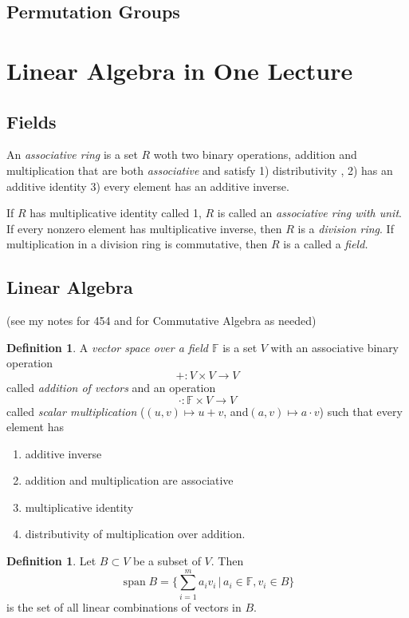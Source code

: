 \documentclass[12pt]{article}
\theoremstyle{definition}
\newtheorem{defn}[thm]{Definition}
\def\FF{\mathbb{F}}
\DeclareMathOperator{\spann}{span}
\begin{document}
\subsection{Permutation Groups} 

\section{Linear Algebra in One Lecture}

\subsection{Fields}

An \emph{associative ring} is a set $R$ woth two binary operations, addition and multiplication that are both \emph{associative} and satisfy 1) distributivity , 2) has an additive identity 3) every element has an additive inverse. 

If $R$ has multiplicative identity called 1, $R$ is called an \emph{associative ring with unit}. If every nonzero element has multiplicative inverse, then $R$ is a \emph{division ring}. If multiplication in a division ring is commutative, then $R$ is a called a \emph{field.}

\subsection{Linear Algebra} (see my notes for 454 and for Commutative Algebra as needed)

\begin{defn}\label{def1-0}
A \emph{vector space over a field $\FF$} is a set $V$ with an associative binary operation $$+ : V \times V \to V$$ called \emph{addition of vectors} and an operation $$\cdot : \FF \times V \to V$$ called \emph{scalar multiplication} ($(u,v) \mapsto u + v$, and$(a,v) \mapsto a\cdot v$) such that every element has 

\begin{enumerate}
\item additive inverse 
\item addition and multiplication are associative
\item multiplicative identity
\item distributivity of multiplication over addition. 
\end{enumerate}
\end{defn}

\begin{defn}\label{def1-1}
Let $B \subset V$ be a subset of $V$. Then $$\spann{B} = \{\sum_{i=1}^m{a_iv_i} \, | \, a_i \in \FF, v_i \in B\}$$ is the set of all linear combinations of vectors in $B$.
\end{defn}
\end{document}
